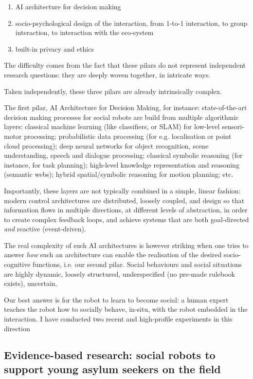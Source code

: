 \documentclass[]{article}
\begin{document}
\begin{enumerate}
    \item AI architecture for decision making
    \item socio-psychological design of the interaction, from 1-to-1
        interaction, to group interaction, to interaction with the eco-system
    \item built-in privacy and ethics
\end{enumerate}

The difficulty comes from the fact that these pilars do not represent independent
research questions: they are deeply woven together, in intricate ways.


Taken independently, these three pilars are already intrinsically complex.

The first pilar, AI Architecture for Decision Making, for instance:
state-of-the-art decision making processes for social robots are build from
multiple algorithmic layers: classical machine learning (like classifiers, or
SLAM) for low-level sensori-motor processing; probabilistic data processing (for
e.g. localisation or point cloud processing); deep neural networks for object
recognition, scene understanding, speech and dialogue processing; classical
symbolic reasoning (for instance, for task planning); high-level knowledge
representation and reasoning (semantic webs); hybrid spatial/symbolic reasoning
for motion planning; etc.

Importantly, these layers are not typically combined in a simple, linear
fashion: modern control architectures are distributed, loosely coupled, and
design so that information flows in multiple directions, at different levels of
abstraction, in order to create complex feedback loops, and achieve systems that are
both goal-directed \emph{and} reactive (event-driven).


The real complexity of such AI architectures is however striking when one tries
to answer \emph{how} such an architecture can enable the realisation of the
desired socio-cognitive functions, i.e. our second pilar. Social behaviours and
social situations are highly dynamic, loosely structured, underspecified (no
pre-made rulebook exists), uncertain.

Our best answer is for the robot to learn to become social: a human expert teaches
the robot how to socially behave, in-situ, with the robot embedded in the
interaction. I have conducted two recent and high-profile experiments in this
direction

\subsection{Evidence-based research: social robots
to support young asylum seekers on the field}
\end{document}

